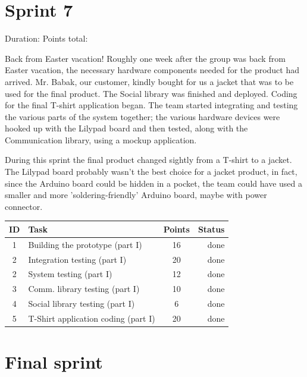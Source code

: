 \newpage

\section{Sprint 7}

Duration:
Points total:

Back from Easter vacation! Roughly one week after the group
was back from Easter vacation, the necessary hardware components needed for the product
had arrived. Mr. Babak, our customer, kindly bought for us a jacket that was to be used
for the final product. The Social library was finished and deployed.
Coding for the final T-shirt application began. The team started integrating
and testing the various parts of the system together; the various hardware devices were
hooked up with the Lilypad board and then tested, along with the Communication library,
using a mockup application.

During this sprint the final product changed sightly from a T-shirt to a jacket.
The Lilypad board probably wasn't the best choice for a jacket product, in fact,
since the Arduino board could be hidden in a pocket, the team could have used a smaller
and more 'soldering-friendly' Arduino board, maybe with power connector.

\begin{table}[ht!]
\begin{tabular}{ | c | l | c | r | }

\hline
\textbf{ID} & \textbf{Task} & \textbf{Points} & \textbf{Status} \\
\hline


1 & Building the prototype	(part I)	& 16 & done \\
\hline
2 & Integration testing		(part I)	& 20 & done \\
\hline
2 & System testing			(part I)	& 12 & done \\
\hline
3 & Comm. library testing	(part I)	& 10 & done \\
\hline
4 & Social library testing	(part I)	& 6  & done \\
\hline
5 & T-Shirt application coding (part I)	& 20 & done \\
\hline


\end{tabular}
\end{table}



\newpage

\section{Final sprint}

